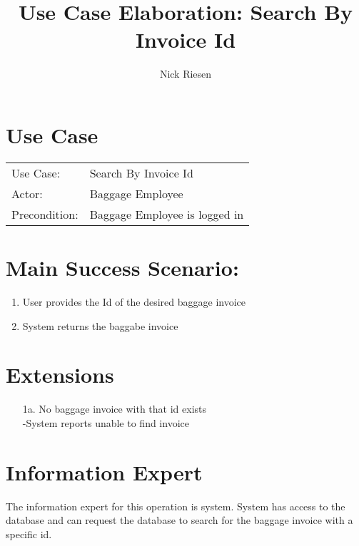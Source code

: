 \documentclass{article}
\title{Use Case Elaboration: Search By Invoice Id}
\author{ Nick Riesen }
\begin{document}
\maketitle


\section*{Use Case}
\begin{tabular}{l l}
Use Case:     & Search By Invoice Id          \\
Actor:        & Baggage Employee              \\
Precondition: & Baggage Employee is logged in \\
\end{tabular}


\section*{Main Success Scenario:}

\begin{enumerate}
    \item  User provides the Id of the desired baggage invoice
    \item System returns the baggabe invoice

\end{enumerate}

\section*{Extensions}
\begin{itemize}
    \item [1a.] No baggage invoice with that id exists \\
        -System reports unable to find invoice
\end{itemize}

\section*{Information Expert}

The information expert for this operation is system. System has access to the database and can request the database to search for the baggage invoice with a specific id.
\end{document}
